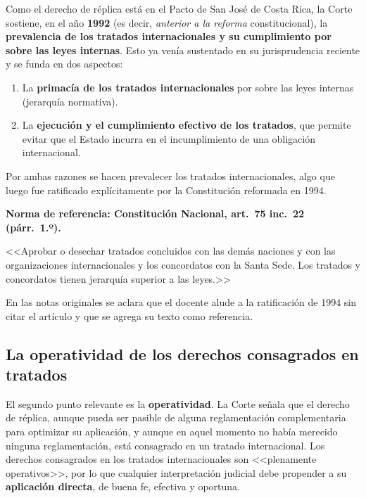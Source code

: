 \documentclass[12pt,oneside]{book}
\begin{document}
Como el derecho de réplica está en el Pacto de San José de Costa Rica, la Corte sostiene, en el año \textbf{1992} (es decir, \textit{anterior a la reforma} constitucional), la \textbf{prevalencia de los tratados internacionales y su cumplimiento por sobre las leyes internas}. Esto ya venía sustentado en su jurisprudencia reciente y se funda en dos aspectos:

\begin{enumerate}
    \item La \textbf{primacía de los tratados internacionales} por sobre las leyes internas (jerarquía normativa).
    \item La \textbf{ejecución y el cumplimiento efectivo de los tratados}, que permite evitar que el Estado incurra en el incumplimiento de una obligación internacional.
\end{enumerate}

Por ambas razones se hacen prevalecer los tratados internacionales, algo que luego fue ratificado explícitamente por la Constitución reformada en 1994.

\begin{note}
\textbf{Norma de referencia: Constitución Nacional, art.~75 inc.~22 (párr.~1.º).}

<<Aprobar o desechar tratados concluidos con las demás naciones y con las organizaciones internacionales y los concordatos con la Santa Sede. Los tratados y concordatos tienen jerarquía superior a las leyes.>>

En las notas originales se aclara que el docente alude a la ratificación de 1994 sin citar el artículo y que se agrega su texto como referencia.
\end{note}

\subsection{La operatividad de los derechos consagrados en tratados}

El segundo punto relevante es la \textbf{operatividad}. La Corte señala que el derecho de réplica, aunque pueda ser pasible de alguna reglamentación complementaria para optimizar su aplicación, y aunque en aquel momento no había merecido ninguna reglamentación, está consagrado en un tratado internacional. Los derechos consagrados en los tratados internacionales son <<plenamente operativos>>, por lo que cualquier interpretación judicial debe propender a su \textbf{aplicación directa}, de buena fe, efectiva y oportuna.
\end{document}

